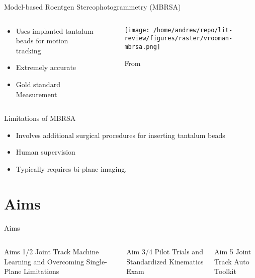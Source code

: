 \documentclass[presentation, aspectratio=1610]{beamer}
\begin{document}
\begin{frame}[label={sec:org9def569}]{Model-based Roentgen Stereophotogrammetry (MBRSA)}
\begin{columns}
\begin{column}{0.5\columnwidth}
\begin{itemize}
\item Uses implanted tantalum beads for motion tracking \autocites{vroomanFastAccurateAutomated1998}[][]{selvikRoentgenStereophotogrammetryMethod1989}
\item Extremely accurate \autocites{kapteinEvaluationThreePose2004}[][]{saariKneeKinematicsMedial2005}
\item Gold standard Measurement \autocite{brobergValidationMachineLearning2023}
\end{itemize}
\end{column}

\begin{column}{0.6\columnwidth}
\begin{figure}[htbp]
\centering
\texttt{[image: /home/andrew/repo/lit-review/figures/raster/vrooman-mbrsa.png]}
\caption{From \autocite{vroomanFastAccurateAutomated1998}}
\end{figure}
\end{column}
\end{columns}
\end{frame}
\begin{frame}[label={sec:orge7a8e21}]{Limitations of MBRSA}
\begin{itemize}
\item Involves additional surgical procedures for inserting tantalum beads
\item Human supervision
\item Typically requires bi-plane imaging.
\end{itemize}
\end{frame}

\section{Aims}
\label{sec:org9bfa3c7}
\begin{frame}[label={sec:orge1f656c}]{Aims}
\begin{columns}
\begin{column}{0.3\columnwidth}
\begin{block}{Aims 1/2}
Joint Track Machine Learning and Overcoming Single-Plane Limitations
\end{block}
\end{column}
\begin{column}{0.3\columnwidth}
\begin{block}{Aim 3/4}
Pilot Trials and Standardized Kinematics Exam
\end{block}
\end{column}
\begin{column}{0.3\columnwidth}
\begin{block}{Aim 5}
Joint Track Auto Toolkit
\end{block}
\end{column}
\end{columns}
\end{frame}
\end{document}
